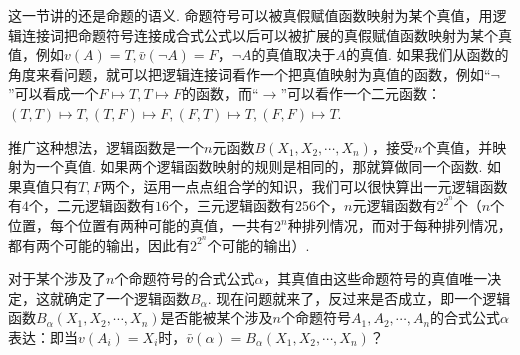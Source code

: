 \documentclass[main.tex]{subfiles}
\begin{document}
这一节讲的还是命题的语义. 命题符号可以被真假赋值函数映射为某个真值，用逻辑连接词把命题符号连接成合式公式以后可以被扩展的真假赋值函数映射为某个真值，例如\(v(A)=T,\bar{v}(\neg A)=F\)，\(\neg A\)的真值取决于\(A\)的真值. 如果我们从函数的角度来看问题，就可以把逻辑连接词看作一个把真值映射为真值的函数，例如“\(\neg\)”可以看成一个\(F \mapsto T, T \mapsto F\)的函数，而“\(\to\)”可以看作一个二元函数：\((T,T) \mapsto T, (T,F) \mapsto F, (F,T) \mapsto T, (F,F) \mapsto T\). 

推广这种想法，逻辑函数是一个\(n\)元函数\(B(X_1, X_2, \cdots, X_n)\)，接受\(n\)个真值，并映射为一个真值. 如果两个逻辑函数映射的规则是相同的，那就算做同一个函数. 如果真值只有\(T,F\)两个，运用一点点组合学的知识，我们可以很快算出一元逻辑函数有\(4\)个，二元逻辑函数有\(16\)个，三元逻辑函数有\(256\)个，\(n\)元逻辑函数有\(2^{2^n}\)个（\(n\)个位置，每个位置有两种可能的真值，一共有\(2^n\)种排列情况，而对于每种排列情况，都有两个可能的输出，因此有\(2^{2^n}\)个可能的输出）. 

对于某个涉及了\(n\)个命题符号的合式公式\(\alpha\)，其真值由这些命题符号的真值唯一决定，这就确定了一个逻辑函数\(B_\alpha\). 现在问题就来了，反过来是否成立，即一个逻辑函数\(B_\alpha(X_1, X_2, \cdots, X_n)\)是否能被某个涉及\(n\)个命题符号\(A_1, A_2, \cdots, A_n\)的合式公式\(\alpha\)表达：即当\(v(A_i)=X_i\)时，\(\bar{v}(\alpha) = B_\alpha(X_1, X_2, \cdots, X_n)\)？
\end{document}
